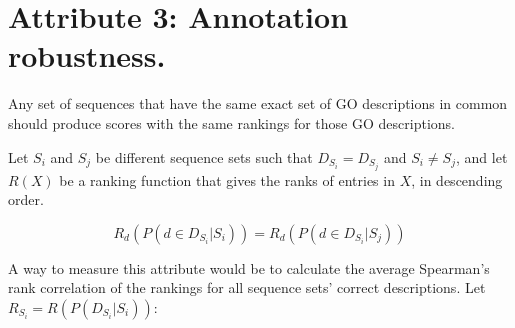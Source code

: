 \documentclass{specification}
\begin{document}








\section*{Attribute 3: Annotation robustness.}

Any set of sequences that have the same exact set of GO descriptions in common should produce scores with the same rankings for those GO descriptions.

Let $S_i$ and $S_j$ be different sequence sets such that $D_{S_i} = D_{S_j}$ and $S_i \neq S_j$, and let $R(X)$ be a ranking function that gives the ranks of entries in $X$, in descending order.

\[R_{d}(P(d \in D_{S_i} | S_i)) = R_{d}(P(d \in D_{S_i} | S_j))\]

A way to measure this attribute would be to calculate the average Spearman's rank correlation of the rankings for all sequence sets' correct descriptions. Let $R_{S_i} = R(P(D_{S_i} | S_i))$:
\end{document}
